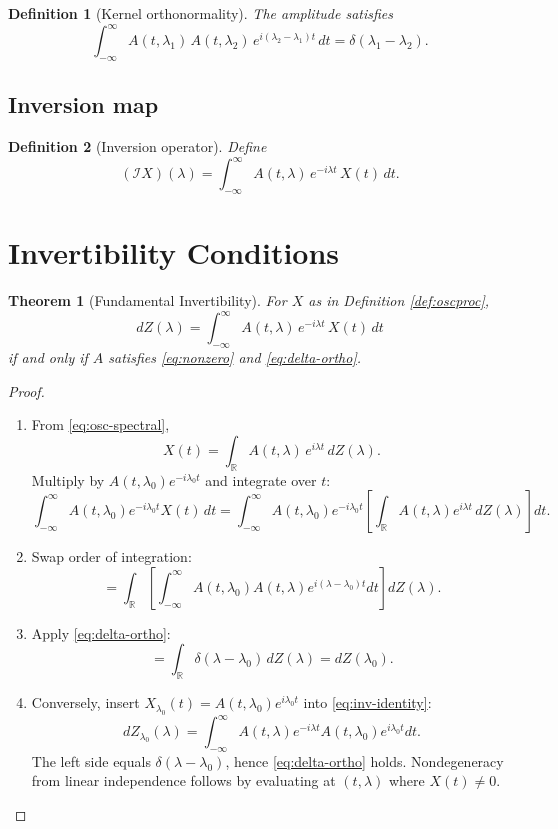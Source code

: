 \documentclass[12pt]{article}
\theoremstyle{plain}
\newtheorem{theorem}{Theorem}
\newtheorem{definition}{Definition}
\begin{document}
\begin{definition}[Kernel orthonormality]\label{def:orthonormality}
The amplitude satisfies
\begin{equation}\label{eq:delta-ortho}
\int_{-\infty}^{\infty} A(t,\lambda_1)\,A(t,\lambda_2)\,e^{i(\lambda_2-\lambda_1)t}\,dt
= \delta(\lambda_1-\lambda_2).
\end{equation}
\end{definition}

\subsection{Inversion map}
\begin{definition}[Inversion operator]\label{def:invop}
Define
\begin{equation}\label{eq:invop}
(\mathcal{I}X)(\lambda) = \int_{-\infty}^{\infty} A(t,\lambda)\,e^{-i\lambda t}\,X(t)\,dt.
\end{equation}
\end{definition}

\section{Invertibility Conditions}

\begin{theorem}[Fundamental Invertibility]\label{thm:fund-inv}
For $X$ as in Definition \ref{def:oscproc},
\begin{equation}\label{eq:inv-identity}
dZ(\lambda) = \int_{-\infty}^{\infty} A(t,\lambda)\,e^{-i\lambda t}\,X(t)\,dt
\end{equation}
if and only if $A$ satisfies \eqref{eq:nonzero} and \eqref{eq:delta-ortho}.
\end{theorem}

\begin{proof}
\begin{enumerate}
\item From \eqref{eq:osc-spectral}, 
\[
X(t) = \int_{\mathbb{R}} A(t,\lambda)\,e^{i\lambda t}\,dZ(\lambda).
\]
Multiply by $A(t,\lambda_0)e^{-i\lambda_0 t}$ and integrate over $t$:
\[
\int_{-\infty}^{\infty} A(t,\lambda_0) e^{-i\lambda_0 t} X(t)\,dt
= \int_{-\infty}^{\infty} A(t,\lambda_0) e^{-i\lambda_0 t}
\left[\int_{\mathbb{R}} A(t,\lambda)e^{i\lambda t} \, dZ(\lambda)\right] dt.
\]
\item Swap order of integration:
\[
= \int_{\mathbb{R}} \left[\int_{-\infty}^\infty A(t,\lambda_0)A(t,\lambda) e^{i(\lambda-\lambda_0)t} dt\right] dZ(\lambda).
\]
\item Apply \eqref{eq:delta-ortho}:
\[
= \int_{\mathbb{R}} \delta(\lambda-\lambda_0) \, dZ(\lambda) = dZ(\lambda_0).
\]
\item Conversely, insert $X_{\lambda_0}(t) = A(t,\lambda_0) e^{i\lambda_0 t}$ into \eqref{eq:inv-identity}:
\[
dZ_{\lambda_0}(\lambda) = \int_{-\infty}^\infty A(t,\lambda) e^{-i\lambda t} A(t,\lambda_0) e^{i\lambda_0 t} dt.
\]
The left side equals $\delta(\lambda-\lambda_0)$, hence \eqref{eq:delta-ortho} holds. Nondegeneracy from linear independence follows by evaluating at $(t,\lambda)$ where $X(t)\neq 0$.
\end{enumerate}
\end{proof}
\end{document}
